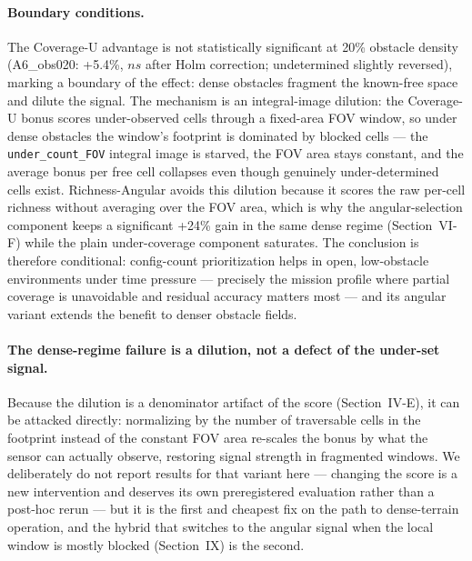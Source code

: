 \documentclass[journal]{IEEEtran}
\newcommand{\CU}{Coverage-U}
\newcommand{\RA}{Richness-Angular}
\begin{document}
\paragraph{Boundary conditions.}
The \CU{} advantage is not statistically significant at 20\% obstacle density
(A6\_obs020: +5.4\%, $ns$ after Holm correction; undetermined slightly
reversed), marking a boundary of the effect: dense obstacles fragment the
known-free space and dilute the signal. The mechanism is an integral-image
dilution: the \CU{} bonus scores under-observed cells through a fixed-area FOV
window, so under dense obstacles the window's footprint is dominated by blocked
cells --- the \texttt{under\_count\_FOV} integral image is starved, the FOV
area stays constant, and the average bonus per free cell collapses even though
genuinely under-determined cells exist. \RA{} avoids this dilution because it
scores the raw per-cell richness without averaging over the FOV area, which is
why the angular-selection component keeps a significant +24\% gain in the same
dense regime (Section~VI-F) while the plain under-coverage component saturates.
The conclusion is therefore conditional: config-count prioritization helps in
open, low-obstacle environments under time pressure --- precisely the mission
profile where partial coverage is unavoidable and residual accuracy matters
most --- and its angular variant extends the benefit to denser obstacle fields.

\paragraph{The dense-regime failure is a dilution, not a defect of the
under-set signal.}
Because the dilution is a denominator artifact of the score
(Section~IV-E), it can be attacked directly: normalizing by the number of
traversable cells in the footprint instead of the constant FOV area re-scales
the bonus by what the sensor can actually observe, restoring signal strength in
fragmented windows. We deliberately do not report results for that variant here
--- changing the score is a new intervention and deserves its own preregistered
evaluation rather than a post-hoc rerun --- but it is the first and cheapest
fix on the path to dense-terrain operation, and the hybrid that switches to
the angular signal when the local window is mostly blocked (Section~IX) is the
second.
\end{document}
